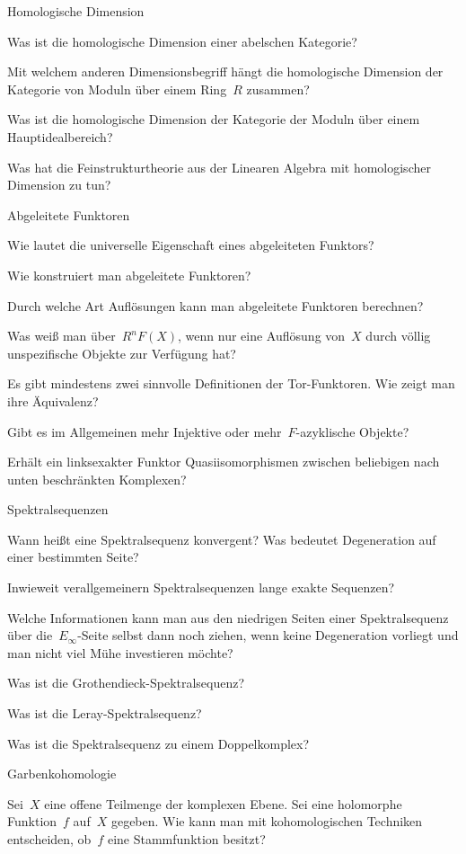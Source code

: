 \documentclass{uebblatt}
\begin{document}
\begin{aufgabeE}{Homologische Dimension}
\item Was ist die homologische Dimension einer abelschen Kategorie?
\item Mit welchem anderen Dimensionsbegriff hängt die homologische Dimension
der Kategorie von Moduln über einem Ring~$R$ zusammen?
\item Was ist die homologische Dimension der Kategorie der Moduln über einem
Hauptidealbereich?
\item Was hat die Feinstrukturtheorie aus der Linearen Algebra mit
homologischer Dimension zu tun?
\end{aufgabeE}

\begin{aufgabeE}{Abgeleitete Funktoren}
\item Wie lautet die universelle Eigenschaft eines abgeleiteten Funktors?
\item Wie konstruiert man abgeleitete Funktoren?
\item Durch welche Art Auflösungen kann man abgeleitete Funktoren berechnen?
\item Was weiß man über~$R^nF(X)$, wenn nur eine Auflösung von~$X$ durch völlig
unspezifische Objekte zur Verfügung hat?
\item Es gibt mindestens zwei sinnvolle Definitionen der Tor-Funktoren. Wie
zeigt man ihre Äquivalenz?
\item Gibt es im Allgemeinen mehr Injektive oder mehr~$F$-azyklische Objekte?
\item Erhält ein linksexakter Funktor Quasiisomorphismen zwischen beliebigen
nach unten beschränkten Komplexen?
\end{aufgabeE}

\begin{aufgabeE}{Spektralsequenzen}
\item Wann heißt eine Spektralsequenz konvergent? Was bedeutet Degeneration auf
einer bestimmten Seite?
\item Inwieweit verallgemeinern Spektralsequenzen lange exakte Sequenzen?
\item Welche Informationen kann man aus den niedrigen Seiten einer
Spektralsequenz über die~$E_\infty$-Seite selbst dann noch ziehen, wenn keine
Degeneration vorliegt und man nicht viel Mühe investieren möchte?
\item Was ist die Grothendieck-Spektralsequenz?
\item Was ist die Leray-Spektralsequenz?
\item Was ist die Spektralsequenz zu einem Doppelkomplex?
\end{aufgabeE}

\begin{aufgabeE}{Garbenkohomologie}
\item Sei~$X$ eine offene Teilmenge der komplexen Ebene. Sei eine holomorphe
Funktion~$f$ auf~$X$ gegeben. Wie kann man mit kohomologischen Techniken
entscheiden, ob~$f$ eine Stammfunktion besitzt?
\end{aufgabeE}
\end{document}
